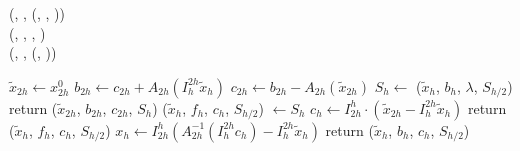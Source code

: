 \begin{bnf}
\setcounter{equation}{6}
 {
	(\bnfts{$\omega$}, \bnfsp \bnfes, \bnfsp {}(, , \bnfsp {}))
 }
 \\
\setcounter{equation}{8}
 {
    (, \bnfsp {}, \bnfsp {}, )
	}
 \\
 \setcounter{equation}{11}
 {
	(, \bnfsp {}, \bnfsp {}(, \bnfsp {}))
}
\end{bnf}
\begin{table}[!htb]
	\begin{algorithmic}
	\State $\tilde{x}_{2h} \gets x_{2h}^0$ 
	\State $b_{2h} \gets c_{2h} + A_{2h} \left( I_{h}^{2h} \tilde{x}_h \right) $
	\State $c_{2h} \gets b_{2h} - A_{2h} \left( \tilde{x}_{2h} \right)$ 
	\State $S_h \gets$ ($\tilde{x}_{h}$, $b_{h}$, $\lambda$, $S_{h/2}$)
	\State return ($\tilde{x}_{2h}$, $b_{2h}$, $c_{2h}$, $S_h$)
	\EndFunction
	\State
	\State ($\tilde{x}_h$, $f_{h}$, $c_h$, $S_{h/2}$) $\gets S_{h}$
	\State $c_h \gets I_{2h}^{h} \cdot (\tilde{x}_{2h} - I_{h}^{2h} \tilde{x}_h)$
	\State return ($\tilde{x}_h$, $f_{h}$, $c_h$, $S_{h/2}$)
	\EndFunction
    \State
	\State $x_{h} \gets I_{2h}^{h} \left( A_{2h}^{-1}\left( I_{h}^{2h} c_h \right) - I_{h}^{2h} \tilde{x}_h \right)$ 
	\State return ($\tilde{x}_{h}$, $b_{h}$, $c_{h}$, $S_{h/2}$)
	\EndFunction
	\end{algorithmic}
\end{table}